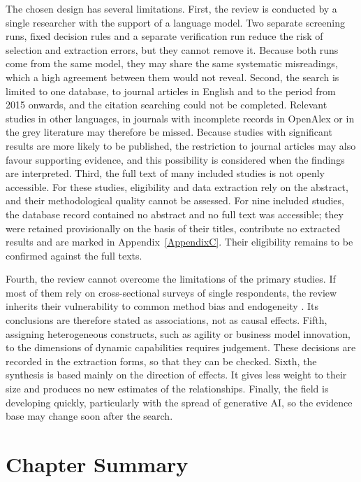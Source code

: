 The chosen design has several limitations. First, the review is conducted by a single researcher with the support of a language model. Two separate screening runs, fixed decision rules and a separate verification run reduce the risk of selection and extraction errors, but they cannot remove it. Because both runs come from the same model, they may share the same systematic misreadings, which a high agreement between them would not reveal. Second, the search is limited to one database, to journal articles in English and to the period from 2015 onwards, and the citation searching could not be completed. Relevant studies in other languages, in journals with incomplete records in OpenAlex or in the grey literature may therefore be missed. Because studies with significant results are more likely to be published, the restriction to journal articles may also favour supporting evidence, and this possibility is considered when the findings are interpreted. Third, the full text of many included studies is not openly accessible. For these studies, eligibility and data extraction rely on the abstract, and their methodological quality cannot be assessed. For nine included studies, the database record contained no abstract and no full text was accessible; they were retained provisionally on the basis of their titles, contribute no extracted results and are marked in Appendix~\ref{AppendixC}. Their eligibility remains to be confirmed against the full texts.

Fourth, the review cannot overcome the limitations of the primary studies. If most of them rely on cross-sectional surveys of single respondents, the review inherits their vulnerability to common method bias and endogeneity \parencite{podsakoff2024, hill2021}. Its conclusions are therefore stated as associations, not as causal effects. Fifth, assigning heterogeneous constructs, such as agility or business model innovation, to the dimensions of dynamic capabilities requires judgement. These decisions are recorded in the extraction forms, so that they can be checked. Sixth, the synthesis is based mainly on the direction of effects. It gives less weight to their size and produces no new estimates of the relationships. Finally, the field is developing quickly, particularly with the spread of generative AI, so the evidence base may change soon after the search.

\section{Chapter Summary}
\label{sec:ch3summary}

